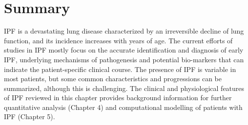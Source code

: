 \section{Summary}
IPF is a devastating lung disease characterized by an irreversible decline of lung function, and its incidence increases with years of age. The current efforts of studies in IPF mostly focus on the  accurate identification and diagnosis of early IPF, underlying mechanisms of pathogenesis and potential bio-markers that can indicate the patient-specific clinical course. The presence of IPF is variable in most patients, but some common characteristics and progressions can be summarized, although this is challenging. The clinical and physiological features of IPF reviewed in this chapter provides background information for further quantitative analysis (Chapter 4) and computational modelling of patients with IPF (Chapter 5). 
